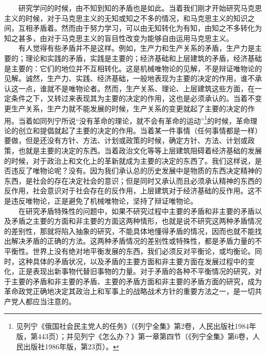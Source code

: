 \documentclass[cn,11pt,chinese]{elegantbook}
\begin{document}
　　研究学问的时候，由不知到知的矛盾也是如此。当着我们刚才开始研究马克思主义的时候，对于马克思主义的无知或知之不多的情况，和马克思主义的知识之间，互相矛盾着。然而由于努力学习，可以由无知转化为有知，由知之不多转化为知之甚多，由对于马克思主义的盲目性改变为能够自由运用马克思主义。\\
　　有人觉得有些矛盾并不是这样。例如，生产力和生产关系的矛盾，生产力是主要的；理论和实践的矛盾，实践是主要的；经济基础和上层建筑的矛盾，经济基础是主要的：它们的地位并不互相转化。这是机械唯物论的见解，不是辩证唯物论的见解。诚然，生产力、实践、经济基础，一般地表现为主要的决定的作用，谁不承认这一点，谁就不是唯物论者。然而，生产关系、理论、上层建筑这些方面，在一定条件之下，又转过来表现其为主要的决定的作用，这也是必须承认的。当着不变更生产关系，生产力就不能发展的时候，生产关系的变更就起了主要的决定的作用。当着如同列宁所说“没有革命的理论，就不会有革命的运动”\footnote[25]{ 见列宁《俄国社会民主党人的任务》（《列宁全集》第2卷，人民出版社1984年版，第443页）；并见列宁《怎么办？》第一章第四节（《列宁全集》第6卷，人民出版社1986年版，第23页）。}的时候，革命理论的创立和提倡就起了主要的决定的作用。当着某一件事情（任何事情都是一样）要做，但是还没有方针、方法、计划或政策的时候，确定方针、方法、计划或政策，也就是主要的决定的东西。当着政治文化等等上层建筑阻碍着经济基础的发展的时候，对于政治上和文化上的革新就成为主要的决定的东西了。我们这样说，是否违反了唯物论呢？没有。因为我们承认总的历史发展中是物质的东西决定精神的东西，是社会的存在决定社会的意识；但是同时又承认而且必须承认精神的东西的反作用，社会意识对于社会存在的反作用，上层建筑对于经济基础的反作用。这不是违反唯物论，正是避免了机械唯物论，坚持了辩证唯物论。\\
　　在研究矛盾特殊性的问题中，如果不研究过程中主要的矛盾和非主要的矛盾以及矛盾之主要的方面和非主要的方面这两种情形，也就是说不研究这两种矛盾情况的差别性，那就将陷入抽象的研究，不能具体地懂得矛盾的情况，因而也就不能找出解决矛盾的正确的方法。这两种矛盾情况的差别性或特殊性，都是矛盾力量的不平衡性。世界上没有绝对地平衡发展的东西，我们必须反对平衡论，或均衡论。同时，这种具体的矛盾状况，以及矛盾的主要方面和非主要方面在发展过程中的变化，正是表现出新事物代替旧事物的力量。对于矛盾的各种不平衡情况的研究，对于主要的矛盾和非主要的矛盾、主要的矛盾方面和非主要的矛盾方面的研究，成为革命政党正确地决定其政治上和军事上的战略战术方针的重要方法之一，是一切共产党人都应当注意的。\\
\end{document}
